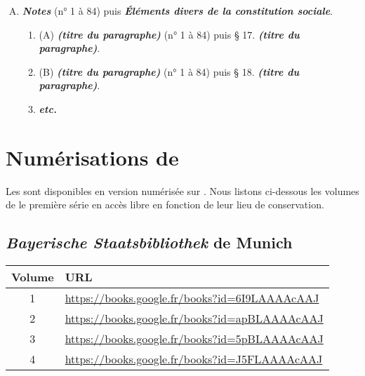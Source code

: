 \begin{enumerate}[A.]
\begin{enumerate}[I.]
        \item (\textbf{\textit{Budget domestique annuel}}\footnote{Cette section ne possède un titre que dans huit monographies}).
        \begin{enumerate}[]
            \item \textit{§ 14. Budget des recettes de l'année.}
            \item \textit{§ 15. Budget des dépenses de l'année.}
            \item \textit{Comptes annexés aux budgets} \footnotesize{(n° 1 à 84) puis} \textit{§ 16. Comptes annexés aux budgets.}
        \end{enumerate}
    \end{enumerate}
    \item \textbf{\textit{Notes}} \footnotesize{(n° 1 à 84) puis} \textbf{\textit{Éléments divers de la constitution sociale}}.
    \begin{enumerate}[]
            \item (A) \textbf{\textit{(titre du paragraphe)}} \footnotesize{(n° 1 à 84) puis} § 17. \textbf{\textit{(titre du paragraphe)}}.
            \item (B) \textbf{\textit{(titre du paragraphe)}} \footnotesize{(n° 1 à 84) puis} § 18. \textbf{\textit{(titre du paragraphe)}}.
            \item \textbf{\textit{etc.}}
        \end{enumerate}
\end{enumerate}

\clearpage

\section{Numérisations de \gb}\label{numgb}

Les \odm{} sont disponibles en version numérisée sur \gb. Nous listons ci-dessous les volumes de le première série en accès libre en fonction de leur lieu de conservation.

\subsection{\textit{Bayerische Staatsbibliothek} de Munich}
\begin{center}
\begin{tabular}{ | c | p{13cm} | }
\hline
Volume & URL \\ \hline
1 & \url{https://books.google.fr/books?id=6I9LAAAAcAAJ} \\ \hline
2 & \url{https://books.google.fr/books?id=apBLAAAAcAAJ} \\ \hline
3 & \url{https://books.google.fr/books?id=5pBLAAAAcAAJ} \\ \hline
4 & \url{https://books.google.fr/books?id=J5FLAAAAcAAJ} \\ \hline
\end{tabular}
\end{center}

